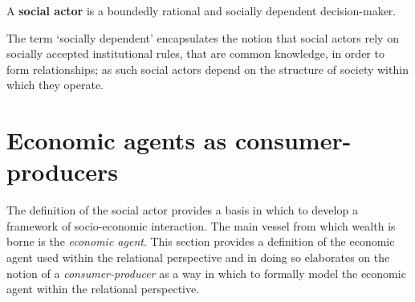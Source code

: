 \begin{definition}
A \textbf{social actor} is a boundedly rational and socially dependent decision-maker.
\end{definition}

The term `socially dependent' encapsulates the notion that social actors rely on socially accepted institutional rules, that are common knowledge, in order to form relationships; as such social actors depend on the structure of society within which they operate.



\section{Economic agents as consumer-producers}

The definition of the social actor provides a basis in which to develop a framework of socio-economic interaction. The main vessel from which wealth is borne is the \emph{economic agent}. This section provides a definition of the economic agent used within the relational perspective and in doing so elaborates on the notion of a \emph{consumer-producer} as a way in which to formally model the economic agent within the relational perspective.

